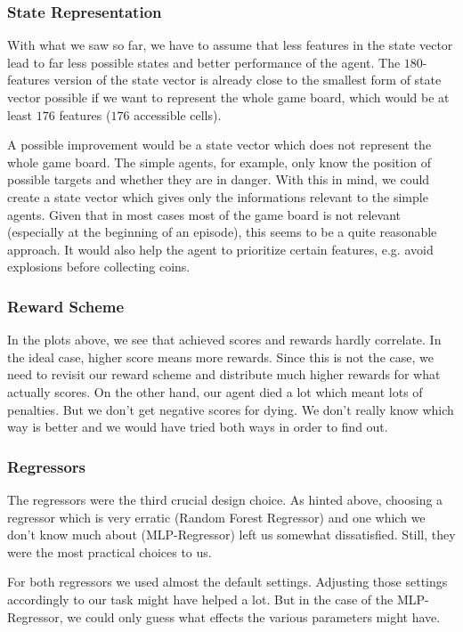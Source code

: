 \subsubsection{State Representation}
With what we saw so far, we have to assume that less features in the state vector lead to far less possible states and better performance of the agent. The $180$-features version of the state vector is already close to the smallest form of state vector possible if we want to represent the whole game board, which would be at least $176$ features ($176$ accessible cells). \par
A possible improvement would be a state vector which does not represent the whole game board. The simple agents, for example, only know the position of possible targets and whether they are in danger. With this in mind, we could create a state vector which gives only the informations relevant to the simple agents. Given that in most cases most of the game board is not relevant (especially at the beginning of an episode), this seems to be a quite reasonable approach. It would also help the agent to prioritize certain features, e.g. avoid explosions before collecting coins.

\subsubsection{Reward Scheme}
In the plots above, we see that achieved scores and rewards hardly correlate. In the ideal case, higher score means more rewards. Since this is not the case, we need to revisit our reward scheme and distribute much higher rewards for what actually scores. On the other hand, our agent died a lot which meant lots of penalties. But we don't get negative scores for dying. We don't really know which way is better and we would have tried both ways in order to find out.

\subsubsection{Regressors}
The regressors were the third crucial design choice. As hinted above, choosing a regressor which is very erratic (Random Forest Regressor) and one which we don't know much about (MLP-Regressor) left us somewhat dissatisfied. Still, they were the most practical choices to us.\par
For both regressors we used almost the default settings. Adjusting those settings accordingly to our task might have helped a lot. But in the case of the MLP-Regressor, we could only guess what effects the various parameters might have. \par


